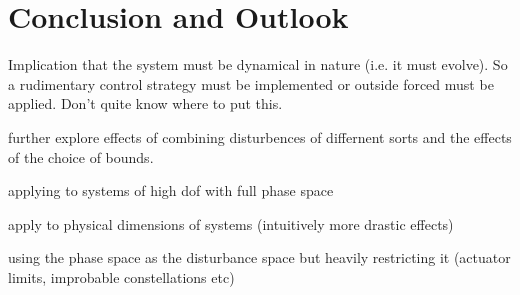 \chapter{Conclusion and Outlook}



Implication that the system must be dynamical in nature (i.e. it must evolve). So a rudimentary control strategy must be implemented or outside forced must be applied. Don't quite know where to put this. 


further explore effects of combining disturbences of differnent sorts and the effects of the choice of bounds.

applying to systems of high dof with full phase space

apply to physical dimensions of systems (intuitively more drastic effects)

using the phase space as the disturbance space but heavily restricting it (actuator limits, improbable constellations etc)